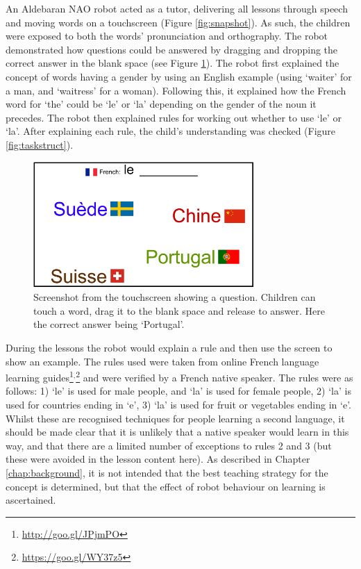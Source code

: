 An Aldebaran NAO robot acted as a tutor, delivering all lessons through speech and moving words on a touchscreen (Figure \ref{fig:snapshot}). As such, the children were exposed to both the words' pronunciation and orthography. The robot demonstrated how questions could be answered by dragging and dropping the correct answer in the blank space (see Figure \ref{fig:screenshot}). The robot first explained the concept of words having a gender by using an English example (using `waiter' for a man, and `waitress' for a woman). Following this, it explained how the French word for `the' could be `le' or `la' depending on the gender of the noun it precedes. The robot then explained rules for working out whether to use `le' or `la'. After explaining each rule, the child's understanding was checked (Figure \ref{fig:taskstruct}). 

\begin{figure}[t!]
    \centering
    \includegraphics[width=0.75\textwidth]{images/ch9_Screenshot.png}
    \caption{Screenshot from the touchscreen showing a question. Children can touch a word, drag it to the blank space and release to answer. Here the correct answer being `Portugal'.}
    \label{fig:screenshot}
\end{figure}

During the lessons the robot would explain a rule and then use the screen to show an example. The rules used were taken from online French language learning guides\footnote{\label{note1}\url{http://goo.gl/JPjmPO}}$^{,}$\footnote{\label{note2}\url{https://goo.gl/WY37z5}} and were verified by a French native speaker. The rules were as follows: 1) `le' is used for male people, and `la' is used for female people, 2) `la' is used for countries ending in `e', 3) `la' is used for fruit or vegetables ending in `e'. Whilst these are recognised techniques for people learning a second language, it should be made clear that it is unlikely that a native speaker would learn in this way, and that there are a limited number of exceptions to rules 2 and 3 (but these were avoided in the lesson content here). As described in Chapter \ref{chap:background}, it is not intended that the best teaching strategy for the concept is determined, but that the effect of robot behaviour on \gls{learning} is ascertained.

